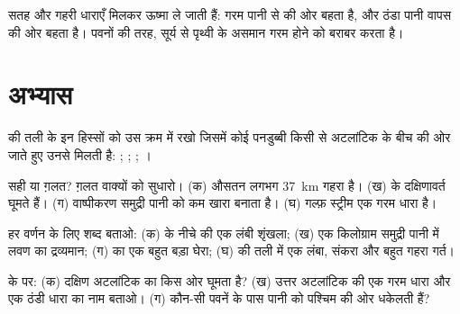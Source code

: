 सतह और गहरी धाराएँ मिलकर ऊष्मा ले जाती हैं: गरम पानी  से  की ओर बहता
है, और ठंडा पानी वापस  की ओर बहता है। पवनों की तरह,  सूर्य से पृथ्वी
के असमान गरम होने को बराबर करता
है।

\section{अभ्यास}

\begin{exercise}[$\star$]\label{exo:g8:the-oceans:1}
 की तली के इन हिस्सों को उस क्रम में रखो जिसमें कोई पनडुब्बी किसी  से अटलांटिक
के बीच की ओर जाते हुए उनसे मिलती है: ; ; ;
।
\end{exercise}

\begin{exercise}[$\star$]\label{exo:g8:the-oceans:2}
सही या ग़लत? ग़लत वाक्यों को सुधारो। (क)  औसतन लगभग \qty{37}{km} गहरा है।
(ख)  के  दक्षिणावर्त घूमते हैं। (ग) वाष्पीकरण समुद्री पानी को कम खारा
बनाता है। (घ) गल्फ़ स्ट्रीम एक गरम धारा
है।
\end{exercise}

\begin{exercise}[$\star$]\label{exo:g8:the-oceans:3}
हर वर्णन के लिए शब्द बताओ: (क)  के नीचे  की एक लंबी शृंखला; (ख) एक
किलोग्राम समुद्री पानी में लवण का द्रव्यमान; (ग)  का एक बहुत बड़ा घेरा;
(घ)  की तली में एक लंबा, संकरा और बहुत गहरा
गर्त।
\end{exercise}

\begin{exercise}[$\star$]\label{exo:g8:the-oceans:4}
 के  पर: (क) दक्षिण अटलांटिक का  किस ओर घूमता है? (ख) उत्तर अटलांटिक
की एक गरम धारा और एक ठंडी धारा का नाम बताओ। (ग) कौन-सी पवनें  के पास पानी
को पश्चिम की ओर धकेलती हैं?
\end{exercise}

